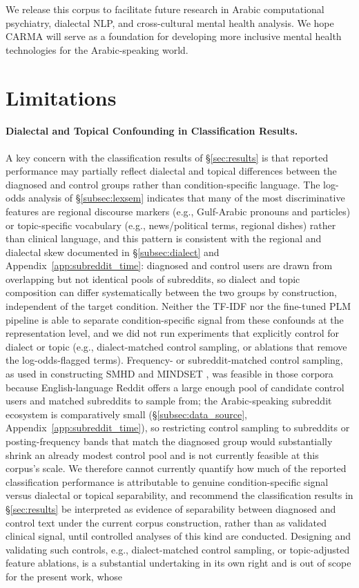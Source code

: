 \documentclass[letterpaper]{article} %
\begin{document}
We release this corpus to facilitate future research in Arabic computational psychiatry, dialectal NLP, and cross-cultural mental health analysis. We hope CARMA will serve as a foundation for developing more inclusive mental health technologies for the Arabic-speaking world.




\section*{Limitations}
\paragraph{Dialectal and Topical Confounding in Classification Results.}
A key concern with the classification results of §\ref{sec:results} is that reported performance may partially reflect dialectal and topical differences between the diagnosed and control groups rather than condition-specific language. The log-odds analysis of §\ref{subsec:lexsem} indicates that many of the most discriminative features are regional discourse markers (e.g., Gulf-Arabic pronouns and particles) or topic-specific vocabulary (e.g., news/political terms, regional dishes) rather than clinical language, and this pattern is consistent with the regional and dialectal skew documented in §\ref{subsec:dialect} and Appendix~\ref{app:subreddit_time}: diagnosed and control users are drawn from overlapping but not identical pools of subreddits, so dialect and topic composition can differ systematically between the two groups by construction, independent of the target condition. Neither the TF-IDF nor the fine-tuned PLM pipeline is able to separate condition-specific signal from these confounds at the representation level, and we did not run experiments that explicitly control for dialect or topic (e.g., dialect-matched control sampling, or ablations that remove the log-odds-flagged terms). Frequency- or subreddit-matched control sampling, as used in constructing SMHD \citep{cohan-etal-2018-smhd} and MINDSET \citep{mankarious2025mindset}, was feasible in those corpora because English-language Reddit offers a large enough pool of candidate control users and matched subreddits to sample from; the Arabic-speaking subreddit ecosystem is comparatively small (\S\ref{subsec:data_source}, Appendix~\ref{app:subreddit_time}), so restricting control sampling to subreddits or posting-frequency bands that match the diagnosed group would substantially shrink an already modest control pool and is not currently feasible at this corpus's scale. We therefore cannot currently quantify how much of the reported classification performance is attributable to genuine condition-specific signal versus dialectal or topical separability, and recommend the classification results in §\ref{sec:results} be interpreted as evidence of separability between diagnosed and control text under the current corpus construction, rather than as validated clinical signal, until controlled analyses of this kind are conducted. Designing and validating such controls, e.g., dialect-matched control sampling, or topic-adjusted feature ablations, is a substantial undertaking in its own right and is out of scope for the present work, whose 
\end{document}
